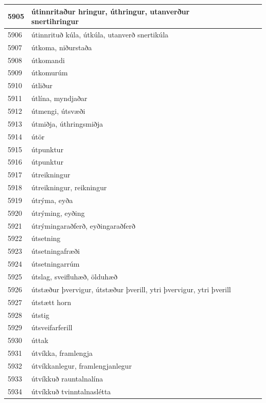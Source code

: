 \begin{longtable}{p{}|p{}|p{}|p{}|p{}}
\hline
5905 & útinnritaður hringur, úthringur, utanverður snertihringur &  &  &  \\
\hline
5906 & útinnrituð kúla, útkúla, utanverð snertikúla &  &  &  \\
\hline
5907 & útkoma, niðurstaða &  &  &  \\
\hline
5908 & útkomandi &  &  &  \\
\hline
5909 & útkomurúm &  &  &  \\
\hline
5910 & útliður &  &  &  \\
\hline
5911 & útlína, myndjaðar &  &  &  \\
\hline
5912 & útmengi, útsvæði &  &  &  \\
\hline
5913 & útmiðja, úthringsmiðja &  &  &  \\
\hline
5914 & útör &  &  &  \\
\hline
5915 & útpunktur &  &  &  \\
\hline
5916 & útpunktur &  &  &  \\
\hline
5917 & útreikningur &  &  &  \\
\hline
5918 & útreikningur, reikningur &  &  &  \\
\hline
5919 & útrýma, eyða &  &  &  \\
\hline
5920 & útrýming, eyðing &  &  &  \\
\hline
5921 & útrýmingaraðferð, eyðingaraðferð &  &  &  \\
\hline
5922 & útsetning &  &  &  \\
\hline
5923 & útsetningafræði &  &  &  \\
\hline
5924 & útsetningarrúm &  &  &  \\
\hline
5925 & útslag, sveifluhæð, ölduhæð &  &  &  \\
\hline
5926 & útstæður þvervigur, útstæður þverill, ytri þvervigur, ytri þverill &  &  &  \\
\hline
5927 & útstætt horn &  &  &  \\
\hline
5928 & útstig &  &  &  \\
\hline
5929 & útsveifarferill &  &  &  \\
\hline
5930 & úttak &  &  &  \\
\hline
5931 & útvíkka, framlengja &  &  &  \\
\hline
5932 & útvíkkanlegur, framlengjanlegur &  &  &  \\
\hline
5933 & útvíkkuð rauntalnalína &  &  &  \\
\hline
5934 & útvíkkuð tvinntalnaslétta &  &  &  \\
\hline

\end{longtable}
